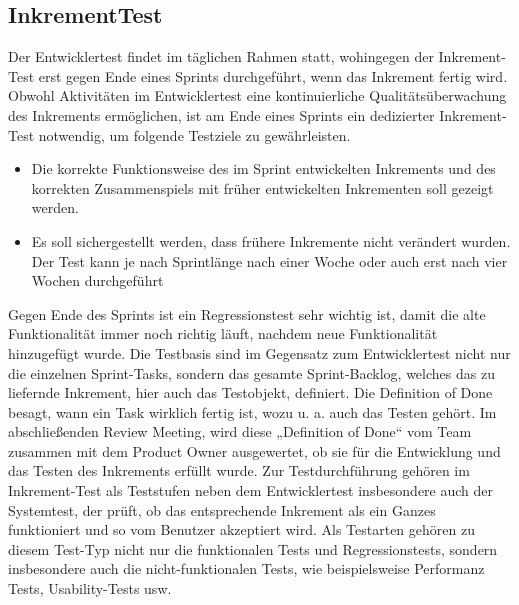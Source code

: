 \subsection{InkrementTest}
\label{sub:InkremenTest}

Der Entwicklertest findet im täglichen Rahmen statt, wohingegen der Inkrement-Test erst gegen Ende eines Sprints durchgeführt, wenn das Inkrement fertig wird. Obwohl Aktivitäten im Entwicklertest eine kontinuierliche Qualitätsüberwachung des Inkrements ermöglichen, ist am Ende eines Sprints ein dedizierter Inkrement-Test notwendig, um folgende Testziele zu gewährleisten.

\begin{itemize}
  \item Die korrekte Funktionsweise des im Sprint entwickelten Inkrements und des korrekten Zusammenspiels mit früher entwickelten Inkrementen soll gezeigt werden.
  \item Es soll sichergestellt werden, dass frühere Inkremente nicht verändert wurden. Der Test kann je nach Sprintlänge nach einer Woche oder auch erst nach vier Wochen durchgeführt 
\end{itemize}

Gegen Ende des Sprints ist ein Regressionstest sehr wichtig ist, damit die alte Funktionalität immer noch richtig läuft, nachdem neue Funktionalität hinzugefügt wurde.
Die Testbasis sind im Gegensatz zum Entwicklertest nicht nur die einzelnen Sprint-Tasks, sondern das gesamte Sprint-Backlog, welches das zu liefernde Inkrement, hier auch das Testobjekt, definiert. Die Definition of Done besagt, wann ein Task wirklich fertig ist, wozu u. a. auch das Testen gehört. Im abschließenden Review Meeting, wird diese „Definition of Done“ vom Team zusammen mit dem Product Owner ausgewertet, ob sie für die Entwicklung und das Testen des Inkrements erfüllt wurde. Zur Testdurchführung gehören im Inkrement-Test als Teststufen neben dem Entwicklertest insbesondere auch der Systemtest, der prüft, ob das entsprechende Inkrement als ein Ganzes funktioniert und so vom Benutzer akzeptiert wird. Als Testarten gehören zu diesem Test-Typ nicht nur die funktionalen Tests und Regressionstests, sondern insbesondere auch die nicht-funktionalen Tests, wie beispielsweise Performanz Tests, Usability-Tests usw.

